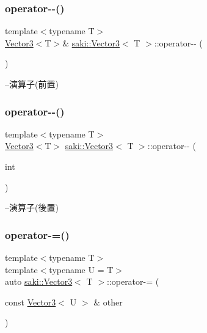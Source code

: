 \subsubsection{\texorpdfstring{operator-\/-\/()}{operator--()}\hspace{0.1cm}{\footnotesize\ttfamily [1/2]}}
{\footnotesize\ttfamily template$<$typename T$>$ \\
\mbox{\hyperlink{classsaki_1_1_vector3}{Vector3}}$<$T$>$\& \mbox{\hyperlink{classsaki_1_1_vector3}{saki\+::\+Vector3}}$<$ T $>$\+::operator-\/-\/ (\begin{DoxyParamCaption}{ }\end{DoxyParamCaption})\hspace{0.3cm}{\ttfamily [inline]}}



--演算子(前置) 

\mbox{\label{classsaki_1_1_vector3_a4d1ff848a3a4bcce6c7911e2f7ac3d7d}} 
\subsubsection{\texorpdfstring{operator-\/-\/()}{operator--()}\hspace{0.1cm}{\footnotesize\ttfamily [2/2]}}
{\footnotesize\ttfamily template$<$typename T$>$ \\
\mbox{\hyperlink{classsaki_1_1_vector3}{Vector3}}$<$T$>$ \mbox{\hyperlink{classsaki_1_1_vector3}{saki\+::\+Vector3}}$<$ T $>$\+::operator-\/-\/ (\begin{DoxyParamCaption}\item[{int}]{ }\end{DoxyParamCaption})\hspace{0.3cm}{\ttfamily [inline]}}



--演算子(後置) 

\mbox{\label{classsaki_1_1_vector3_a3c15f413dc1c0aaef7311bd6dbb7224d}} 
\subsubsection{\texorpdfstring{operator-\/=()}{operator-=()}}
{\footnotesize\ttfamily template$<$typename T$>$ \\
template$<$typename U  = T$>$ \\
auto \mbox{\hyperlink{classsaki_1_1_vector3}{saki\+::\+Vector3}}$<$ T $>$\+::operator-\/= (\begin{DoxyParamCaption}\item[{const \mbox{\hyperlink{classsaki_1_1_vector3}{Vector3}}$<$ U $>$ \&}]{other }\end{DoxyParamCaption})\hspace{0.3cm}{\ttfamily [inline]}}



